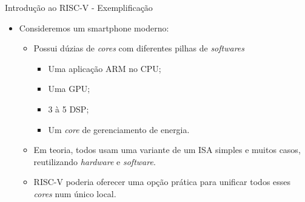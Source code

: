 \documentclass[aspectratio=169]{beamer}
\begin{document}
\begin{frame}{Introdução ao RISC-V - Exemplificação}
	\begin{itemize}
		\item Consideremos um smartphone moderno:
		\begin{itemize}
			\item Possui dúzias de \textit{cores} com diferentes pilhas de \textit{softwares}
			\begin{itemize}
				\item Uma aplicação ARM no CPU;
				\item Uma GPU;
				\item 3 à 5 DSP;
				\item Um \textit{core} de gerenciamento de energia.
			\end{itemize}

			\item Em teoria, todos usam uma variante de um ISA simples e muitos casos, reutilizando \textit{hardware} e \textit{software}.

				\bigskip

			\item RISC-V poderia oferecer uma opção prática para unificar todos esses \textit{cores} num único local.
		\end{itemize}
	\end{itemize}
\end{frame}
\end{document}
